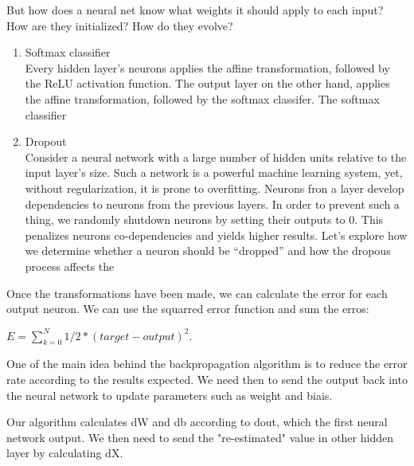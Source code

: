 

But how does a neural net know what weights it should apply to each input?
How are they initialized?
How do they evolve?
   
\begin{enumerate}    
   \item Softmax classifier\\
     Every hidden layer's neurons applies the affine transformation, followed by the ReLU activation function.
     The output layer on the other hand,  applies the affine transformation, followed by the softmax classifer.
     The softmax classifier 



   \item Dropout\\
     Consider a neural network with a large number of hidden units relative to the input layer's size.
     Such a network is a powerful machine learning system, yet, without regularization, it is prone to overfitting.
     Neurons fron a layer develop dependencies to neurons from the previous layers.
     In order to prevent such a thing, we randomly shutdown neurons by setting their outputs to 0.
     This penalizes neurons co-dependencies and yields higher results.
     Let's explore how we determine whether a neuron should be ``dropped'' and how the dropous process affects the 

\end{enumerate}
Once the transformations have been made, we can calculate the error for each output neuron. We can use the squarred error function and sum the erros:

$E = \sum_{k=0}^{N} 1/2*(target - output)^2$.

One of the main idea behind the backpropagation algorithm is to reduce the error rate according to the results expected. We need then to send the output back into the neural network to update parameters such as weight and biais. 

Our algorithm calculates dW and db according to dout, which the first neural network output.
We then need to send the "re-estimated" value in other hidden layer by calculating dX.


